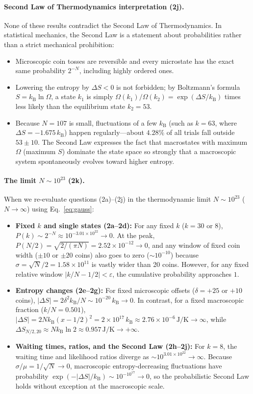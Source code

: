 \documentclass[11pt, a4paper]{article}
\newcommand{\kB}{k_{\mathrm{B}}}
\begin{document}
\paragraph{Second Law of Thermodynamics interpretation (2j).}
None of these results contradict the Second Law of Thermodynamics. In statistical mechanics, the Second Law is a statement about probabilities rather than a strict mechanical prohibition:
\begin{itemize}
\item Microscopic coin tosses are reversible and every microstate has the exact same probability $2^{-N}$, including highly ordered ones.
\item Lowering the entropy by $\Delta S < 0$ is not forbidden; by Boltzmann's formula $S = \kB\ln\Omega$, a state $k_1$ is simply $\Omega(k_1)/\Omega(k_2) = \exp(\Delta S/\kB)$ times less likely than the equilibrium state $k_2 = 53$.
\item Because $N=107$ is small, fluctuations of a few $\kB$ (such as $k=63$, where $\Delta S = -1.675\,\kB$) happen regularly—about $4.28\%$ of all trials fall outside $53\pm 10$. The Second Law expresses the fact that macrostates with maximum $\Omega$ (maximum $S$) dominate the state space so strongly that a macroscopic system spontaneously evolves toward higher entropy.
\end{itemize}

\paragraph{The limit $N \sim 10^{23}$ (2k).}
When we re-evaluate questions (2a)--(2j) in the thermodynamic limit $N \sim 10^{23}$ ($N \to \infty$) using Eq.~\eqref{eq:gauss}:
\begin{itemize}
\item \textbf{Fixed $k$ and single states (2a--2d):} For any fixed $k$ ($k=30$ or $8$), $P(k) \sim 2^{-N} \approx 10^{-3.01\times 10^{22}} \to 0$. At the peak, $P(N/2) = \sqrt{2/(\pi N)} = 2.52\times 10^{-12} \to 0$, and any window of fixed coin width ($\pm 10$ or $\pm 20$ coins) also goes to zero ($\sim 10^{-10}$) because $\sigma = \sqrt{N}/2 = 1.58\times 10^{11}$ is vastly wider than 20 coins. However, for any fixed relative window $|k/N - 1/2| < \varepsilon$, the cumulative probability approaches $1$.
\item \textbf{Entropy changes (2e--2g):} For fixed microscopic offsets ($\delta = +25$ or $+10$ coins), $|\Delta S| = 2\delta^2\kB/N \sim 10^{-20}\,\kB \to 0$. In contrast, for a fixed macroscopic fraction ($k/N = 0.501$), $|\Delta S| = 2N\kB(x-1/2)^2 = 2\times 10^{17}\,\kB \approx 2.76\times 10^{-6}\,\mathrm{J/K} \to \infty$, while $\Delta S_{N/2, 20} \approx N\kB\ln 2 \approx 0.957\,\mathrm{J/K} \to +\infty$.
\item \textbf{Waiting times, ratios, and the Second Law (2h--2j):} For $k=8$, the waiting time and likelihood ratios diverge as $\sim 10^{3.01\times 10^{22}} \to \infty$. Because $\sigma/\mu = 1/\sqrt{N} \to 0$, macroscopic entropy-decreasing fluctuations have probability $\exp(-|\Delta S|/\kB) \sim 10^{-10^{17}} \to 0$, so the probabilistic Second Law holds without exception at the macroscopic scale.
\end{itemize}
\end{document}
